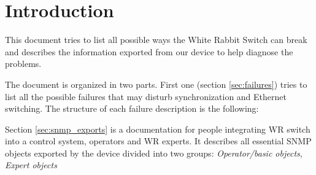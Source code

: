 \section{Introduction}

This document tries to list all possible ways the White Rabbit Switch can
break and describes the information exported from our device to help diagnose
the problems.

The document is organized in two parts. First one (section \ref{sec:failures})
tries to list all the possible failures that may disturb synchronization and
Ethernet switching. The structure of each failure description is the following:

Section \ref{sec:snmp_exports} is a documentation for people integrating WR
switch into a control system, operators and WR experts. It describes all
essential SNMP objects exported by the device divided into two groups:
\emph{Operator/basic objects}, \emph{Expert objects}
